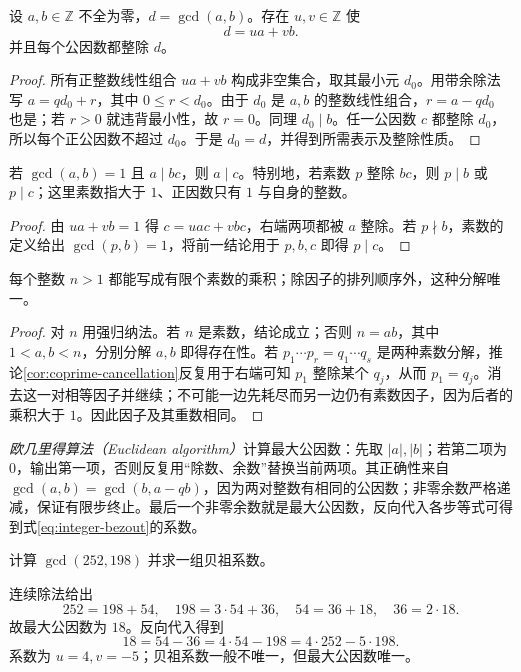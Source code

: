\begin{theorem}[贝祖等式]\label{thm:integer-bezout}
设 $a,b\in\mathbb Z$ 不全为零，$d=\gcd(a,b)$。存在 $u,v\in\mathbb Z$ 使
\begin{equation}\label{eq:integer-bezout}
  d=ua+vb.
\end{equation}
并且每个公因数都整除 $d$。
\end{theorem}
\begin{proof}
所有正整数线性组合 $ua+vb$ 构成非空集合，取其最小元 $d_0$。用带余除法写 $a=qd_0+r$，其中 $0\leq r<d_0$。由于 $d_0$ 是 $a,b$ 的整数线性组合，$r=a-qd_0$ 也是；若 $r>0$ 就违背最小性，故 $r=0$。同理 $d_0\mid b$。任一公因数 $c$ 都整除 $d_0$，所以每个正公因数不超过 $d_0$。于是 $d_0=d$，并得到所需表示及整除性质。
\end{proof}

\begin{corollary}[互素消去与欧几里得引理]\label{cor:coprime-cancellation}
若 $\gcd(a,b)=1$ 且 $a\mid bc$，则 $a\mid c$。特别地，若素数 $p$ 整除 $bc$，则 $p\mid b$ 或 $p\mid c$；这里素数指大于 $1$、正因数只有 $1$ 与自身的整数。
\end{corollary}
\begin{proof}
由 $ua+vb=1$ 得 $c=uac+vbc$，右端两项都被 $a$ 整除。若 $p\nmid b$，素数的定义给出 $\gcd(p,b)=1$，将前一结论用于 $p,b,c$ 即得 $p\mid c$。
\end{proof}

\begin{theorem}[整数的唯一素因子分解]\label{thm:integer-factorization}
每个整数 $n>1$ 都能写成有限个素数的乘积；除因子的排列顺序外，这种分解唯一。
\end{theorem}
\begin{proof}
对 $n$ 用强归纳法。若 $n$ 是素数，结论成立；否则 $n=ab$，其中 $1<a,b<n$，分别分解 $a,b$ 即得存在性。若 $p_1\cdots p_r=q_1\cdots q_s$ 是两种素数分解，推论\ref{cor:coprime-cancellation}反复用于右端可知 $p_1$ 整除某个 $q_j$，从而 $p_1=q_j$。消去这一对相等因子并继续；不可能一边先耗尽而另一边仍有素数因子，因为后者的乘积大于 $1$。因此因子及其重数相同。
\end{proof}

\emph{欧几里得算法（Euclidean algorithm）}计算最大公因数：先取 $|a|,|b|$；若第二项为 $0$，输出第一项，否则反复用“除数、余数”替换当前两项。其正确性来自 $\gcd(a,b)=\gcd(b,a-qb)$，因为两对整数有相同的公因数；非零余数严格递减，保证有限步终止。最后一个非零余数就是最大公因数，反向代入各步等式可得到式\eqref{eq:integer-bezout}的系数。

\begin{example}[求最大公因数与贝祖系数]\label{ex:euclidean-algorithm}
计算 $\gcd(252,198)$ 并求一组贝祖系数。
\end{example}
\begin{solve}
连续除法给出
\[
  252=198+54,\quad 198=3\cdot54+36,\quad
  54=36+18,\quad 36=2\cdot18.
\]
故最大公因数为 $18$。反向代入得到
\[
  18=54-36=4\cdot54-198=4\cdot252-5\cdot198.
\]
系数为 $u=4,v=-5$；贝祖系数一般不唯一，但最大公因数唯一。
\end{solve}

